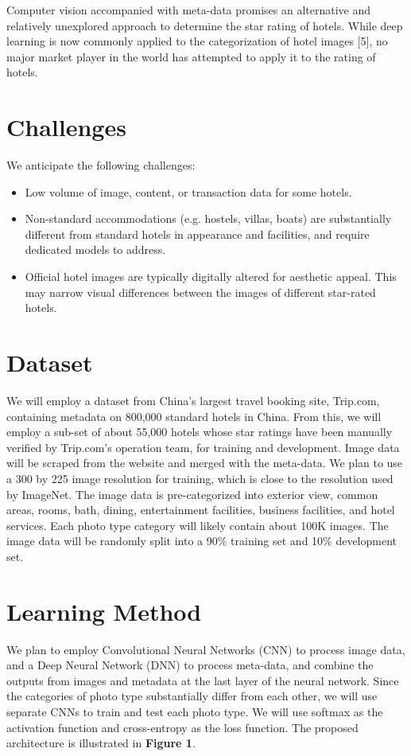 \documentclass{article}
\begin{document}
Computer vision accompanied with meta-data promises an alternative and relatively unexplored approach to determine the star rating of hotels. While deep learning is now commonly applied to the categorization of hotel images [5], no major market player in the world has attempted to apply it to the rating of hotels.

\section{Challenges}
We anticipate the following challenges:
\begin{itemize}
    \item Low volume of image, content, or transaction data for some hotels. 
    \item Non-standard accommodations (e.g. hostels, villas, boats) are substantially different from standard hotels in appearance and facilities, and require dedicated models to address. 
    \item Official hotel images are typically digitally altered for aesthetic appeal. This may narrow visual differences between the images of different star-rated hotels.

\end{itemize}


\section{Dataset}
We will employ a dataset from China’s largest travel booking site, Trip.com, containing metadata on 800,000 standard hotels in China. From this, we will employ a sub-set of about 55,000 hotels whose star ratings have been manually verified by Trip.com’s operation team, for training and development. Image data will be scraped from the website and merged with the meta-data. We plan to use a 300 by 225 image resolution for training, which is close to the resolution used by ImageNet. The image data is pre-categorized into exterior view, common areas, rooms, bath, dining, entertainment facilities, business facilities, and hotel services. Each photo type category will likely contain about 100K images. The image data will be randomly split into a 90\% training set and 10\% development set.  

\section{ Learning Method }
We plan to employ Convolutional Neural Networks (CNN) to process image data, and a Deep Neural Network (DNN) to process meta-data, and combine the outputs from images and metadata at the last layer of the neural network. Since the categories of photo type substantially differ from each other, we will use separate CNNs to train and test each photo type. We will use softmax as the activation function and cross-entropy as the loss function. The proposed architecture is illustrated in \textbf{Figure 1}.
\end{document}
